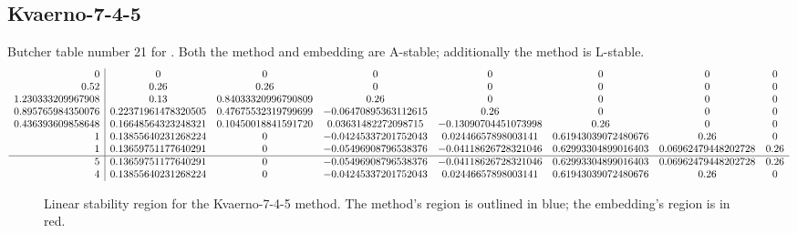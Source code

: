 \documentclass[letterpaper,10pt,english]{sphinxmanual}
\begin{document}
\subsection{Kvaerno-7-4-5}
\label{Butcher:kvaerno-7-4-5}\label{Butcher:butcher-kvaerno-7-4-5}
Butcher table number 21
for {\hyperref[c_interface/User_callable:ARKodeSetIRKTableNum]{}}.  Both the
method and embedding are A-stable; additionally the method is
L-stable.
\begin{gather}
\begin{split}\begin{array}{r|ccccccc}
  0 & 0 & 0 & 0 & 0 & 0 & 0 & 0 \\
  0.52 & 0.26 & 0.26 & 0 & 0 & 0 & 0 & 0 \\
  1.230333209967908 & 0.13 & 0.84033320996790809 & 0.26 & 0 & 0 & 0 & 0 \\
  0.895765984350076 & 0.22371961478320505 & 0.47675532319799699 & -0.06470895363112615 & 0.26 & 0 & 0 & 0 \\
  0.436393609858648 & 0.16648564323248321 & 0.10450018841591720 & 0.03631482272098715 & -0.13090704451073998 & 0.26 & 0 & 0 \\
  1 & 0.13855640231268224 & 0 & -0.04245337201752043 & 0.02446657898003141 & 0.61943039072480676 & 0.26 & 0 \\
  1 & 0.13659751177640291 & 0 & -0.05496908796538376 & -0.04118626728321046 & 0.62993304899016403 & 0.06962479448202728 & 0.26 \\
  \hline
  5 & 0.13659751177640291 & 0 & -0.05496908796538376 & -0.04118626728321046 & 0.62993304899016403 & 0.06962479448202728 & 0.26 \\
  4 & 0.13855640231268224 & 0 & -0.04245337201752043 & 0.02446657898003141 & 0.61943039072480676 & 0.26 & 0
\end{array}\end{split}\notag
\end{gather}\begin{figure}[htbp]
\centering
\capstart

\caption{Linear stability region for the Kvaerno-7-4-5 method.  The method's
region is outlined in blue; the embedding's region is in red.}\end{figure}
\end{document}

